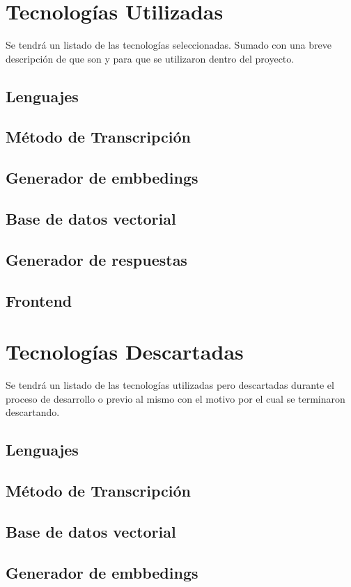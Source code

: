 \documentclass{../../prgrado}
\begin{document}
\section{Tecnologías Utilizadas}

Se tendrá un listado de las tecnologías seleccionadas. Sumado con una breve descripción de que son y para que se utilizaron dentro del proyecto.
\subsection{Lenguajes}
\subsection{Método de Transcripción}
\subsection{Generador de embbedings}
\subsection{Base de datos vectorial}
\subsection{Generador de respuestas}
\subsection{Frontend}
\section{Tecnologías Descartadas}

Se tendrá un listado de las tecnologías utilizadas pero descartadas durante el proceso de desarrollo o previo al mismo con el motivo por el cual se terminaron descartando.  

\subsection{Lenguajes}
\subsection{Método de Transcripción}
\subsection{Base de datos vectorial}
\subsection{Generador de embbedings}
\end{document}
